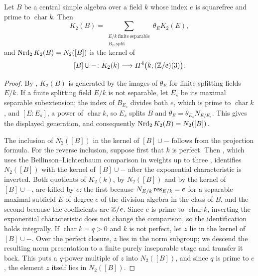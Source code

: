 \begin{lemma}\label{lem:second-three-kahn-levine}
Let $B$ be a central simple algebra over a field $k$ whose index $e$ is squarefree and prime to $\operatorname{char}k$.
Then
\[
 K_2(B)=\sum_{\substack{E/k\ \mathrm{finite\ separable}\\ B_E\ \mathrm{split}}}\theta_EK_2(E),
\]
and $\operatorname{Nrd}_2K_2(B)=N_2([B])$ is the kernel of
\[
 [B]\cup-\colon K_2(k)\longrightarrow H^4\bigl(k,(\mathbb Z/e)(3)\bigr).
\]
\end{lemma}
\begin{proof}
By \cite[Proposition 6.6.1(2)]{KahnLevine2010}, $K_2(B)$ is generated by the images of $\theta_E$ for finite splitting fields $E/k$.
If a finite splitting field $E/k$ is not separable, let $E_s$ be its maximal separable subextension; the index of $B_{E_s}$ divides both $e$, which is prime to $\operatorname{char}k$, and $[E:E_s]$, a power of $\operatorname{char}k$, so $E_s$ splits $B$ and $\theta_E=\theta_{E_s}N_{E/E_s}$.
This gives the displayed generation, and consequently $\operatorname{Nrd}_2K_2(B)=N_2([B])$.

The inclusion of $N_2([B])$ in the kernel of $[B]\cup-$ follows from the projection formula.
For the reverse inclusion, suppose first that $k$ is perfect.
Then \cite[Theorem 8.2.2(4)]{KahnLevine2010}, which uses the Beilinson--Lichtenbaum comparison in weights up to three \cite{Voevodsky}, identifies $N_2([B])$ with the kernel of $[B]\cup-$ after the exponential characteristic is inverted.
Both quotients of $K_2(k)$, by $N_2([B])$ and by the kernel of $[B]\cup-$, are killed by $e$: the first because $N_{E/k}\operatorname{res}_{E/k}=e$ for a separable maximal subfield $E$ of degree $e$ of the division algebra in the class of $B$, and the second because the coefficients are $\mathbb Z/e$.
Since $e$ is prime to $\operatorname{char}k$, inverting the exponential characteristic does not change the comparison, so the identification holds integrally.
If $\operatorname{char}k=q>0$ and $k$ is not perfect, let $z$ lie in the kernel of $[B]\cup-$.
Over the perfect closure, $z$ lies in the norm subgroup; we descend the resulting norm presentation to a finite purely inseparable stage and transfer it back.
This puts a $q$-power multiple of $z$ into $N_2([B])$, and since $q$ is prime to $e$, the element $z$ itself lies in $N_2([B])$.
\end{proof}

